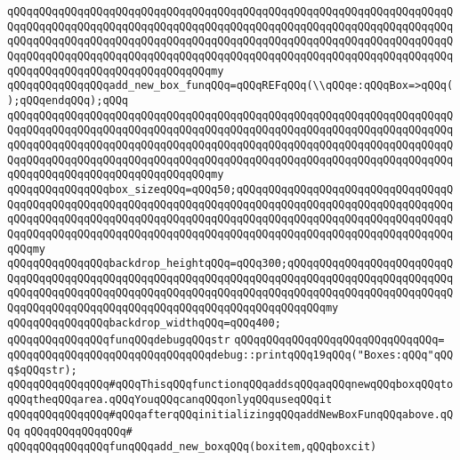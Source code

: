\verb|qQQqqQQqqQQqqQQqqQQqqQQqqQQqqQQqqQQqqQQqqQQqqQQqqQQqqQQqqQQqqQQqqQQqqQQqqQQqqQQqqQQqqQQqqQQqqQQqqQQqqQQqqQQqqQQqqQQqqQQqqQQqqQQqqQQqqQQqqQQqqQQqqQQqqQQqqQQqqQQqqQQqqQQqqQQqqQQqqQQqqQQqqQQqqQQqqQQqqQQqqQQqqQQqqQQqqQQqqQQqqQQqqQQqqQQqqQQqqQQqqQQqqQQqqQQqqQQqqQQqqQQqqQQqqQQqqQQqqQQqqQQqqQQqqQQqqQQqqQQqqQQqqQQqqQQqmy|\newline
\verb|qQQqqQQqqQQqqQQqadd_new_box_funqQQq=qQQqREFqQQq(\\qQQqe:qQQqBox=>qQQq();qQQqendqQQq);qQQq|\newline
\verb|qQQqqQQqqQQqqQQqqQQqqQQqqQQqqQQqqQQqqQQqqQQqqQQqqQQqqQQqqQQqqQQqqQQqqQQqqQQqqQQqqQQqqQQqqQQqqQQqqQQqqQQqqQQqqQQqqQQqqQQqqQQqqQQqqQQqqQQqqQQqqQQqqQQqqQQqqQQqqQQqqQQqqQQqqQQqqQQqqQQqqQQqqQQqqQQqqQQqqQQqqQQqqQQqqQQqqQQqqQQqqQQqqQQqqQQqqQQqqQQqqQQqqQQqqQQqqQQqqQQqqQQqqQQqqQQqqQQqqQQqqQQqqQQqqQQqqQQqqQQqqQQqqQQqqQQqmy|\newline
\verb|qQQqqQQqqQQqqQQqbox_sizeqQQq=qQQq50;qQQqqQQqqQQqqQQqqQQqqQQqqQQqqQQqqQQqqQQqqQQqqQQqqQQqqQQqqQQqqQQqqQQqqQQqqQQqqQQqqQQqqQQqqQQqqQQqqQQqqQQqqQQqqQQqqQQqqQQqqQQqqQQqqQQqqQQqqQQqqQQqqQQqqQQqqQQqqQQqqQQqqQQqqQQqqQQqqQQqqQQqqQQqqQQqqQQqqQQqqQQqqQQqqQQqqQQqqQQqqQQqqQQqqQQqqQQqqQQqqQQqqQQqmy|\newline
\verb|qQQqqQQqqQQqqQQqbackdrop_heightqQQq=qQQq300;qQQqqQQqqQQqqQQqqQQqqQQqqQQqqQQqqQQqqQQqqQQqqQQqqQQqqQQqqQQqqQQqqQQqqQQqqQQqqQQqqQQqqQQqqQQqqQQqqQQqqQQqqQQqqQQqqQQqqQQqqQQqqQQqqQQqqQQqqQQqqQQqqQQqqQQqqQQqqQQqqQQqqQQqqQQqqQQqqQQqqQQqqQQqqQQqqQQqqQQqqQQqqQQqqQQqqQQqmy|\newline
\verb|qQQqqQQqqQQqqQQqbackdrop_widthqQQq=qQQq400;|\newline
\newline
\newline
\verb|qQQqqQQqqQQqqQQqfunqQQqdebugqQQqstr|\newline
\verb|qQQqqQQqqQQqqQQqqQQqqQQqqQQqqQQq=|\newline
\verb|qQQqqQQqqQQqqQQqqQQqqQQqqQQqqQQqdebug::printqQQq19qQQq("Boxes:qQQq"qQQq$qQQqstr);|\newline
\newline
\verb|qQQqqQQqqQQqqQQq#qQQqThisqQQqfunctionqQQqaddsqQQqaqQQqnewqQQqboxqQQqtoqQQqtheqQQqarea.qQQqYouqQQqcanqQQqonlyqQQquseqQQqit|\newline
\verb|qQQqqQQqqQQqqQQq#qQQqafterqQQqinitializingqQQqaddNewBoxFunqQQqabove.qQQq|\newline
\verb|qQQqqQQqqQQqqQQq#|\newline
\verb|qQQqqQQqqQQqqQQqfunqQQqadd_new_boxqQQq(boxitem,qQQqboxcit)|\newline
